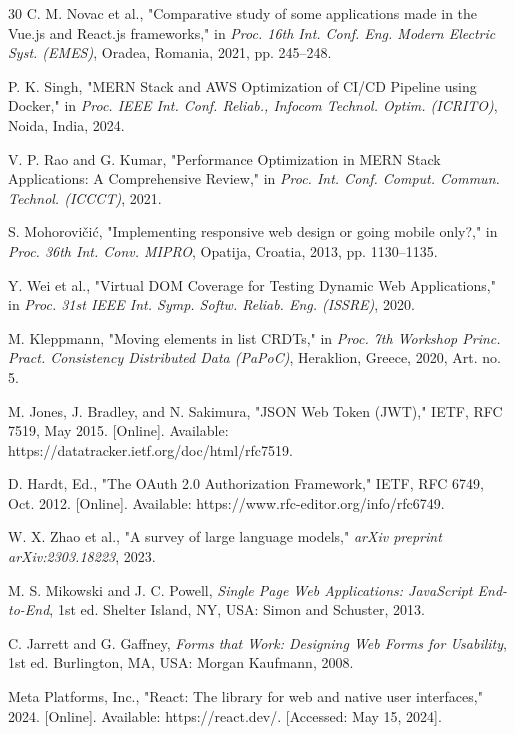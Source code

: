 \begin{thebibliography}{30}
C. M. Novac et al., "Comparative study of some applications made in the Vue.js and React.js frameworks," in \textit{Proc. 16th Int. Conf. Eng. Modern Electric Syst. (EMES)}, Oradea, Romania, 2021, pp. 245--248.

P. K. Singh, "MERN Stack and AWS Optimization of CI/CD Pipeline using Docker," in \textit{Proc. IEEE Int. Conf. Reliab., Infocom Technol. Optim. (ICRITO)}, Noida, India, 2024.

V. P. Rao and G. Kumar, "Performance Optimization in MERN Stack Applications: A Comprehensive Review," in \textit{Proc. Int. Conf. Comput. Commun. Technol. (ICCCT)}, 2021.

S. Mohorovičić, "Implementing responsive web design or going mobile only?," in \textit{Proc. 36th Int. Conv. MIPRO}, Opatija, Croatia, 2013, pp. 1130--1135.

Y. Wei et al., "Virtual DOM Coverage for Testing Dynamic Web Applications," in \textit{Proc. 31st IEEE Int. Symp. Softw. Reliab. Eng. (ISSRE)}, 2020.

M. Kleppmann, "Moving elements in list CRDTs," in \textit{Proc. 7th Workshop Princ. Pract. Consistency Distributed Data (PaPoC)}, Heraklion, Greece, 2020, Art. no. 5.

M. Jones, J. Bradley, and N. Sakimura, "JSON Web Token (JWT)," IETF, RFC 7519, May 2015. [Online]. Available: https://datatracker.ietf.org/doc/html/rfc7519.

D. Hardt, Ed., "The OAuth 2.0 Authorization Framework," IETF, RFC 6749, Oct. 2012. [Online]. Available: https://www.rfc-editor.org/info/rfc6749.

W. X. Zhao et al., "A survey of large language models," \textit{arXiv preprint arXiv:2303.18223}, 2023.

M. S. Mikowski and J. C. Powell, \textit{Single Page Web Applications: JavaScript End-to-End}, 1st ed. Shelter Island, NY, USA: Simon and Schuster, 2013.

C. Jarrett and G. Gaffney, \textit{Forms that Work: Designing Web Forms for Usability}, 1st ed. Burlington, MA, USA: Morgan Kaufmann, 2008.

Meta Platforms, Inc., "React: The library for web and native user interfaces," 2024. [Online]. Available: https://react.dev/. [Accessed: May 15, 2024].


\end{thebibliography}
